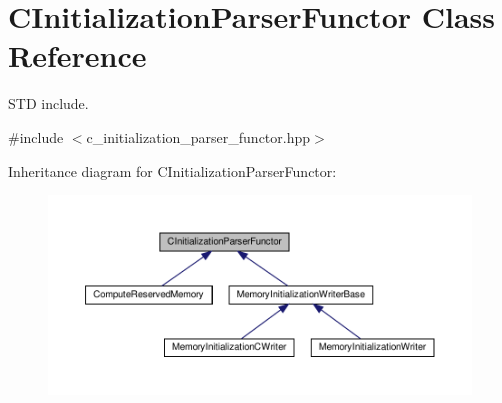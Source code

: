 \hypertarget{classCInitializationParserFunctor}{}\section{C\+Initialization\+Parser\+Functor Class Reference}
\label{classCInitializationParserFunctor}


S\+TD include.  




{\ttfamily \#include $<$c\+\_\+initialization\+\_\+parser\+\_\+functor.\+hpp$>$}



Inheritance diagram for C\+Initialization\+Parser\+Functor\+:
\nopagebreak
\begin{figure}[H]
\begin{center}
\leavevmode
\includegraphics[width=350pt]{dc/d42/classCInitializationParserFunctor__inherit__graph}
\end{center}
\end{figure}
